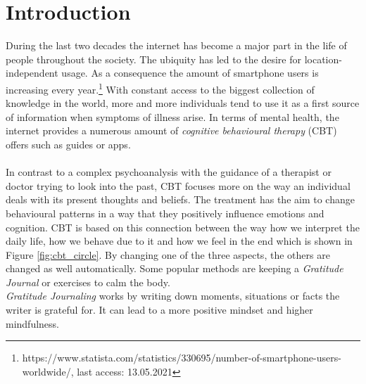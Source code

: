 \documentclass[sigconf, nonacm]{acmart}
\begin{document}
\keywords{}

\maketitle

\section{Introduction}
During the last two decades the internet has become a major part in the life
of people throughout the society. The ubiquity has led to the desire for 
location-independent usage. As a consequence the amount of
smartphone users is increasing every year.\footnote{https://www.statista.com/statistics/330695/number-of-smartphone-users-worldwide/, last access: 13.05.2021}
With constant access to the biggest collection of knowledge in the world,
more and more individuals tend to use it as a first source of information when
symptoms of illness arise\cite{Wyatt2015}. 
In terms of mental health, the internet provides a numerous amount of \emph{cognitive behavioural therapy} (CBT) offers such as guides
or apps. 
\\\\
In contrast to a complex psychoanalysis with the guidance of a therapist or doctor trying to look into the past,
CBT focuses more on the way an individual deals with its present thoughts and beliefs. The treatment has the aim to
change behavioural patterns in a way that they positively influence emotions and cognition. CBT is based on this connection
between the way how we interpret the daily life, how we behave due to it and how we 
feel in the end which is shown in Figure \ref{fig:cbt_circle}. By changing one of the three aspects,
the others are changed as well automatically. Some popular methods are keeping a \emph{Gratitude Journal} or exercises to calm the body.\cite{Spangler2002}
\\
\emph{Gratitude Journaling} works by writing down moments, situations or facts the writer is grateful for. It can lead to a more positive mindset and higher mindfulness. 
\end{document}
